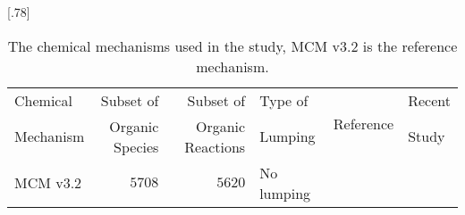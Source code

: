 \documentclass[acpd, online, hvmath]{copernicus}
\providecommand{\DIFaddbeginFL}{} %
\providecommand{\DIFdelbeginFL}{} %
\providecommand{\DIFdelendFL}{} %
\begin{document}
\begin{table}[t]
    \caption{The chemical mechanisms used in the study, MCM v3.2 is the reference mechanism.}
\DIFdelbeginFL %
\DIFdelendFL \DIFaddbeginFL \scalebox{.78}[.78]{\begin{tabular}{lrrlll}
        \tophline
        {Chemical} &{Subset of} &{Subset of} &{Type of} &\multirow{2}{*}{{Reference}} &{Recent}\\
        {Mechanism} &{Organic Species} &{Organic Reactions} &{Lumping} &&{Study}\\
\middlehline
        MCM v3.2 &$5708$ &$5620$ &No lumping &\citet{MCM_Site} & \\

\end{tabular}}
\end{table}
\end{document}
